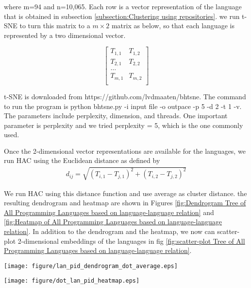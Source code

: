 \documentclass[12pt,oneside,final]{vlsithesis}
\begin{document}
where m=94 and n=10,065. Each row is a vector representation of the language that is obtained in subsection \ref{subsection:Clustering using repositories}. we run t-SNE to turn this matrix to a $m\times 2$ matrix as below, so that each language is represented by a two dimensional vector. 

\[
\begin{bmatrix}
T_{1,1} & T_{1,2} \\
T_{2,1} & T_{2,2} \\
\dots \\
T_{m,1} & T_{m,2}  \\
\end{bmatrix}
\]

t-SNE is downloaded from https://github.com/lvdmaaten/bhtsne. The command to run the program is python bhtsne.py -i input file -o outpace -p 5 -d 2 -t 1 -v. The parameters include perplexity, dimension, and threads.  One important parameter is perplexity and we tried perplexity = 5, which is the one commonly used. 

Once the 2-dimensional vector representations are available for the languages, we run HAC using the Euclidean distance as defined by
\begin{align}
d_{ij}=\sqrt{(T_{i,1}-T_{j,1})^2+ (T_{i,2}-T_{j,2})^2} 
\end{align}

We run HAC using this distance function and use average as cluster distance. the resulting dendrogram and heatmap are shown in Figures \ref{fig:Dendrogram Tree of All Programming Languages based on language-language relation} and \ref{fig:Heatmap of All Programming Languages based on language-language relation}. In addition to the dendrogram and the heatmap, we now can scatter-plot 2-dimensional embeddings of the languages in fig \ref{fig:scatter-plot  Tree of All Programming Languages based on language-language relation}. 
\begin{figure*}
	\centering
		\texttt{[image: figure/lan\_pid\_dendrogram\_dot\_average.eps]}
	\caption{Languages clustered by Euclidian distance when dimensions are reduced to two using t-SNE}
	\label{fig:Dendrogram Tree of All Programming Languages based on language-language relation}
\end{figure*}

\begin{figure*}
	\centering
		\texttt{[image: figure/dot\_lan\_pid\_heatmap.eps]}
	\caption{Heatmap of All Programming Languages based on language-language relation}
	\label{fig:Heatmap of All Programming Languages based on language-language relation}
\end{figure*}
\end{document}
